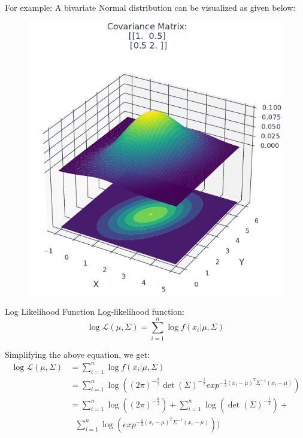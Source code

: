 \documentclass[handout]{beamer}
\begin{document}
\begin{frame}
    For example: A bivariate Normal distribution can be visualized as given below:
    \begin{figure}
                \centerline{\includegraphics[scale = 0.75]{../figures/mle/bivariate_normal.pdf}}
\end{figure}
    
\end{frame}

\begin{frame}{Log Likelihood Function}
    Log-likelihood function:
    \begin{equation}
        \log \mathcal{L}(\mu, \Sigma) = \sum_{i=1}^n \log f(x_i|\mu, \Sigma)
    \end{equation}

    Simplifying the above equation, we get:
    \begin{align*}
        \log \mathcal{L}(\mu, \Sigma) &= \sum_{i=1}^n \log f(x_i|\mu, \Sigma) \\
        &= \sum_{i=1}^n \log \left((2\pi)^{-\frac{k}{2}}\det(\Sigma)^{-\frac{1}{2}}exp^{-\frac{1}{2}(x_i-\mu)^{T}\Sigma^{-1}(x_i-\mu)} \right) \\
        &= \sum_{i=1}^n \log ((2\pi)^{-\frac{k}{2}}) + \sum_{i=1}^n \log (\det(\Sigma)^{-\frac{1}{2}}) + \\ & \ \ \ \sum_{i=1}^n \log(exp^{-\frac{1}{2}(x_i-\mu)^{T}\Sigma^{-1}(x_i-\mu)} )) 
        \end{align*}
\end{frame}
\end{document}
